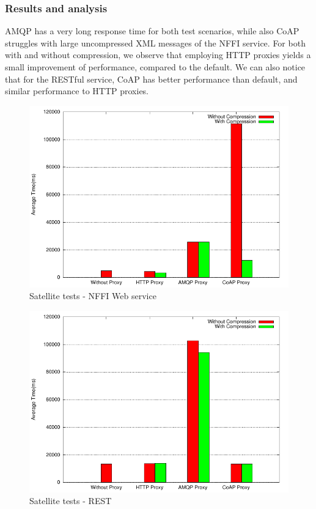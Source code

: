 \subsubsection{Results and analysis}

AMQP has a very long response time for both test scenarios, while also CoAP
struggles with large uncompressed XML messages of the NFFI service. For both
with and without compression, we observe that employing HTTP proxies yields a
small improvement of performance, compared to the default. We can also notice
that for the RESTful service, CoAP has better performance than default, and
similar performance to HTTP proxies.

\begin{figure}[H]
\center
\includegraphics[scale=0.75]{../results/satellite/nffi/result.pdf}
\caption{Satellite tests - NFFI Web service}
\end{figure}

\begin{figure}[H]
\center
\includegraphics[scale=0.75]{../results/satellite/rest/result.pdf}
\caption{Satellite tests - REST}
\end{figure}

